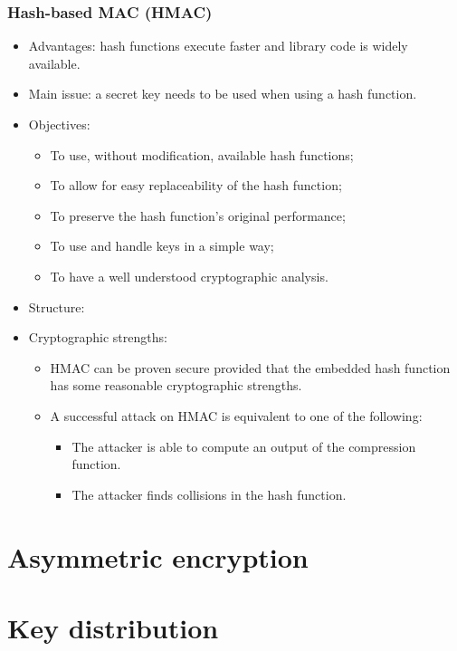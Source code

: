 \documentclass[12pt]{article}
\begin{document}
 \subsubsection{Hash-based MAC (HMAC)}
 \begin{itemize}
 	\item Advantages: hash functions execute faster and library code is widely available.
 	\item Main issue: a secret key needs to be used when using a hash function.
 	\item Objectives:
 	\begin{itemize}
 		\item To use, without modification, available hash functions;
 		\item To allow for easy replaceability of the hash function;
 		\item To preserve the hash function's original performance;
 		\item To use and handle keys in a simple way;
 		\item To have a well understood cryptographic analysis.
 	\end{itemize}
 	\item Structure: 
 	\item Cryptographic strengths:
 	\begin{itemize}
 		\item HMAC can be proven secure provided that the embedded hash function has some reasonable cryptographic strengths.
 		\item A successful attack on HMAC is equivalent to one of the following:
 		\begin{itemize}
 			\item The attacker is able to compute an output of the compression function.
 			\item The attacker finds collisions in the hash function.
 		\end{itemize}
 	\end{itemize}
 \end{itemize}

 
 \section{Asymmetric encryption}
 
 \section{Key distribution}
  
\end{document}
